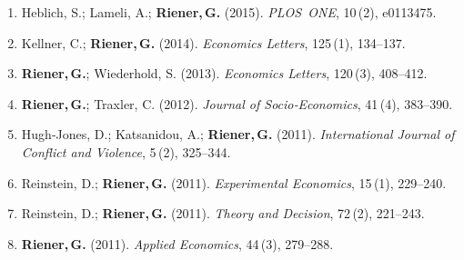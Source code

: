 \documentclass[10pt,A4]{article}
\newcommand{\mystrut}{\rule[-.3\baselineskip]{0pt}{\baselineskip}}
\begin{document}
\begin{enumerate}
\item
  Heblich, S.; Lameli, A.; \textbf{Riener,\,G.} (2015). \emph{PLOS~ONE},
  10\,(2), e0113475.\\
\item
  Kellner, C.; \textbf{Riener,\,G.} (2014). \emph{Economics Letters},
  125\,(1), 134--137.\\
\item
  \textbf{Riener,\,G.}; Wiederhold, S. (2013). \emph{Economics Letters},
  120\,(3), 408--412.\\
\item
  \textbf{Riener,\,G.}; Traxler, C. (2012). \emph{Journal of
  Socio‑Economics}, 41\,(4), 383--390.\\
\item
  Hugh‑Jones, D.; Katsanidou, A.; \textbf{Riener,\,G.} (2011).
  \emph{International Journal of Conflict and Violence}, 5\,(2),
  325--344.\\
\item
  Reinstein, D.; \textbf{Riener,\,G.} (2011). \emph{Experimental
  Economics}, 15\,(1), 229--240.\\
\item
  Reinstein, D.; \textbf{Riener,\,G.} (2011). \emph{Theory and
  Decision}, 72\,(2), 221--243.\\
\item
  \textbf{Riener,\,G.} (2011). \emph{Applied Economics}, 44\,(3),
  279--288.
\end{enumerate}


\null
\vspace*{\fill}
\hspace{-0.25\linewidth}\colorbox{white}{\makebox[1.5\linewidth][c]{\mystrut  \textnormal{\textcolor{sectcol}{gerhardriener.github.io}  *  \textcolor{sectcol}{github.com/gerhardriener}}}}
\end{document}
